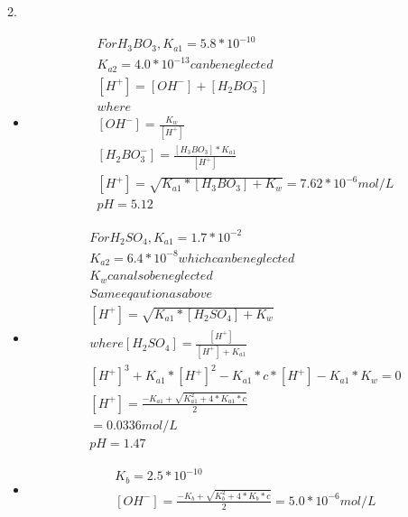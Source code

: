\documentclass{article}
\begin{document}
2.\begin{itemize}
    \item
    \begin{equation}
        \begin{multlined}
        For H_3BO_3, K_{a1} = 5.8*10^{-10}\\
        K_{a2} = 4.0*10^{-13} can be neglected\\
        \left[H^+\right] = \left[OH^-\right] + \left[H_2BO_3^-\right]\\
        where\\
        \left[OH^-\right] = \frac{K_w}{\left[H^+\right]}\\
        \left[H_2BO_3^-\right] = \frac{\left[H_3BO_3\right]*K_{a1}}{\left[H^+\right]}\\
        \left[H^+\right] = \sqrt{K_{a1}*\left[H_3BO_3\right] + K_w} = 7.62*10^{-6}mol/L\\
        pH = 5.12
        \end{multlined}
    \end{equation}
    \item
    \begin{equation}
        \begin{multlined}
            For H_2SO_4, K_{a1} = 1.7*10^{-2}\\
            K_{a2} = 6.4*10^{-8} which can be neglected\\
            K_w can also be neglected\\ 
            Same eqaution as above\\
            \left[H^+\right] = \sqrt{K_{a1}*\left[H_2SO_4\right] + K_w} \\
            where \left[H_2SO_4\right] = \frac{\left[H^+\right]}{\left[H^+\right] + K_{a1}}\\
            \left[H^+\right]^3+K_{a1}*\left[H^+\right]^2-K_{a1}*c*\left[H^+\right] - K_{a1}*K_{w} = 0\\
            \left[H^+\right] = \frac{-K_{a1}+\sqrt{K_{a1}^2+4*K_{a1}*c}}{2}\\
            = 0.0336 mol/L\\
            pH = 1.47
        \end{multlined}
    \end{equation}
    \item
    \begin{equation}
        \begin{multlined}
            K_b=2.5*10^{-10}\\
            \left[OH^-\right] = \frac{-K_b+\sqrt{K_b^2+4*K_b*c}}{2} = 5.0*10^{-6}mol/L\\

\end{multlined}
\end{equation}
\end{itemize}
\end{document}
